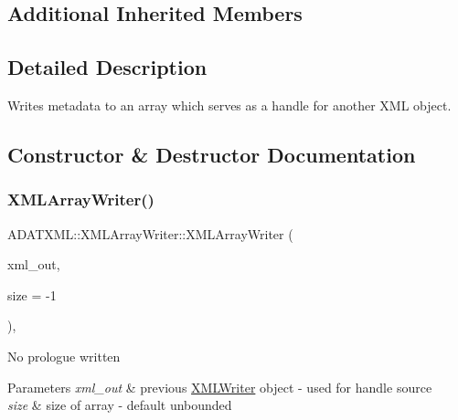 \subsection*{Additional Inherited Members}


\subsection{Detailed Description}
Writes metadata to an array which serves as a handle for another X\+ML object. 

\subsection{Constructor \& Destructor Documentation}
\mbox{\label{classADATXML_1_1XMLArrayWriter_a51816af0342b997945b0d21e4ba30c5d}} 
\subsubsection{\texorpdfstring{XMLArrayWriter()}{XMLArrayWriter()}\hspace{0.1cm}{\footnotesize\ttfamily [1/3]}}
{\footnotesize\ttfamily A\+D\+A\+T\+X\+M\+L\+::\+X\+M\+L\+Array\+Writer\+::\+X\+M\+L\+Array\+Writer (\begin{DoxyParamCaption}\item[{\mbox{\hyperlink{classADATXML_1_1XMLWriter}{X\+M\+L\+Writer}} \&}]{xml\+\_\+out,  }\item[{int}]{size = {\ttfamily -\/1} }\end{DoxyParamCaption})\hspace{0.3cm}{\ttfamily [inline]}, {\ttfamily [explicit]}}

No prologue written 
\begin{DoxyParams}{Parameters}
{\em xml\+\_\+out} & previous \mbox{\hyperlink{classADATXML_1_1XMLWriter}{X\+M\+L\+Writer}} object -\/ used for handle source \\
\hline
{\em size} & size of array -\/ default unbounded \\
\hline
\end{DoxyParams}
\mbox{\label{classADATXML_1_1XMLArrayWriter_ac1e9df12a7df4c52d6026c3b814abf65}} 
